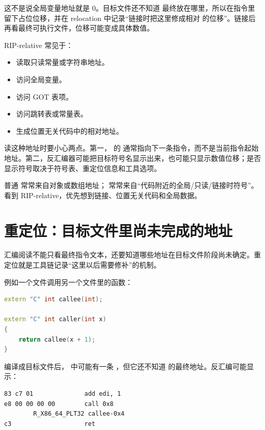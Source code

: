 这不是说全局变量地址就是 0。目标文件还不知道  最终放在哪里，所以在指令里留下占位位移，并在 relocation 中记录“链接时把这里修成相对  的位移”。链接后再看最终可执行文件，位移可能变成具体数值。

RIP-relative 常见于：

\begin{itemize}
  \item 读取只读常量或字符串地址。
  \item 访问全局变量。
  \item 访问 GOT 表项。
  \item 访问跳转表或常量表。
  \item 生成位置无关代码中的相对地址。
\end{itemize}

读这种地址时要小心两点。第一， 的  通常指向下一条指令，而不是当前指令起始地址。第二，反汇编器可能把目标符号名显示出来，也可能只显示数值位移；是否显示符号取决于符号表、重定位信息和工具选项。

\begin{mentalmodel}
普通  常常来自对象或数组地址； 常常来自“代码附近的全局/只读/链接时符号”。看到 RIP-relative，优先想到链接、位置无关代码和全局数据。
\end{mentalmodel}

\section{重定位：目标文件里尚未完成的地址}

汇编阅读不能只看最终指令文本，还要知道哪些地址在目标文件阶段尚未确定。重定位就是工具链记录“这里以后需要修补”的机制。

例如一个文件调用另一个文件里的函数：

\begin{lstlisting}[language=C++]
extern "C" int callee(int);

extern "C" int caller(int x)
{
    return callee(x + 1);
}
\end{lstlisting}

编译成目标文件后， 中可能有一条 ，但它还不知道  的最终地址。反汇编可能显示：

\begin{lstlisting}
83 c7 01              add edi, 1
e8 00 00 00 00        call 0x8
        R_X86_64_PLT32 callee-0x4
c3                    ret
\end{lstlisting}


